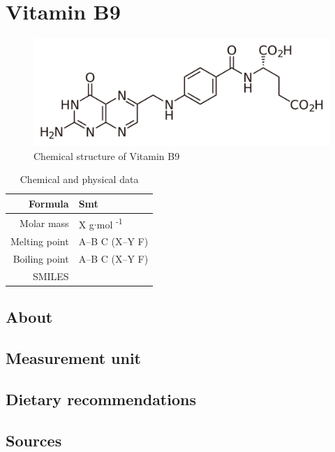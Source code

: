 \documentclass{book}
\begin{document}
\chapter{Vitamin B9}
\begin{figure}[h]
	\caption{Chemical structure of Vitamin B9}
	\centering \includegraphics[width=\textwidth]{images/Vitamin_B9_chemical_structure}
\end{figure}

\begin{table}[h]
	\caption{Chemical and physical data}
	\centering \begin{tabular}{| r | l |}
		\hline
		Formula & Smt\\ \hline
		Molar mass & X g$\cdot$mol \textsuperscript{-1}\\ \hline
		Melting point & A--B \degree C (X--Y \degree F)\\ \hline
		Boiling point & A--B \degree C (X--Y \degree F)\\ \hline
		SMILES & \\ \hline
	\end{tabular}
\end{table}
\newpage

\section{About}


\section{Measurement unit}


\section{Dietary recommendations}


\section{Sources}
\end{document}
